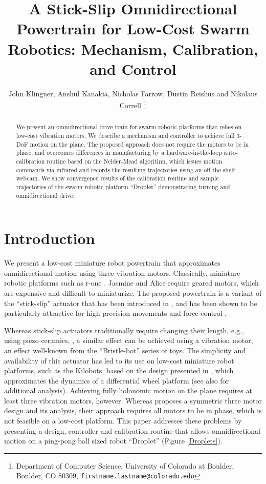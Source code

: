 \documentclass[letterpaper, 10pt, conference]{ieeeconf}
\title{\LARGE \bf
A Stick-Slip Omnidirectional Powertrain for Low-Cost Swarm Robotics: Mechanism, Calibration, and Control
}
\author{John Klingner, Anshul Kanakia, Nicholas Farrow, Dustin Reishus and Nikolaus Correll%
\thanks{Department of Computer Science,
University of Colorado at Boulder,
 Boulder, CO 80309,
{\tt\small firstname.lastname{@}colorado.edu}}%
}
\begin{document}
\maketitle


\begin{abstract}
We present an omnidirectional drive train for swarm robotic platforms that relies on low-cost vibration motors. We describe a mechanism and controller to achieve full 3-DoF motion on the plane. The proposed approach does not require the motors to be in phase, and overcomes differences in manufacturing by a hardware-in-the-loop auto-calibration routine based on the Nelder-Mead algorithm, which issues motion commands via infrared and records the resulting trajectories using an off-the-shelf webcam. We show convergence results of the calibration routine and sample trajectories of the swarm robotic platform ``Droplet'' demonstrating turning and omnidirectional drive.   
\end{abstract}



\section{Introduction}
We present a low-cost miniature robot powertrain that approximates omnidirectional motion using three vibration motors. Classically, miniature robotic platforms such as r-one \cite{mclurkin2013low}, Jasmine \cite{jasmine} and Alice \cite{alice} require geared motors, which are expensive and difficult to miniaturize. The proposed powertrain is a variant of the ``stick-slip'' actuator that has been introduced in \cite{breguet1998stick}, and has been shown to be particularly attractive for high precision movements \cite{brufau2005micron,chu2006novel,martel2001three,martel2005fundamental,eigoli2012locomotion} and force control \cite{vartholomeos2008analysis}.   

Whereas stick-slip actuators traditionally require changing their length, e.g., using piezo ceramics,  \cite{breguet1998stick, martel2005fundamental}, a similar effect can be achieved using a vibration motor, an effect well-known from the ``Bristle-bot'' series of toys. The simplicity and availability of this actuator  has led to its use on low-cost miniature robot platforms, such as the Kilobots, \cite{rubenstein2012kilobot} based on the design presented in \cite{Vartholomeos2006}, which approximates the dynamics of a differential wheel platform (see also \cite{spartali2013speed} for additional analysis). Achieving fully holonomic motion on the plane requires at least three vibration motors, however. Whereas \cite{Vartholomeos2005} proposes a symmetric three motor design and its analysis, their approach requires all motors to be in phase, which is not feasible on a low-cost platform. This paper addresses these problems by presenting a design, controller and calibration routine that allows omnidirectional motion on a ping-pong ball sized robot ``Droplet'' (Figure \ref{Droplets}).
\end{document}
